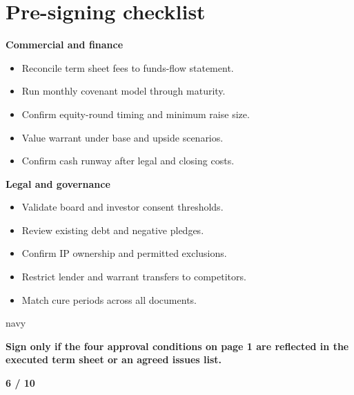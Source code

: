 \section{Pre-signing checklist}

\begin{minipage}[t]{0.49\textwidth}
  \begin{outlinebox}
    \textbf{Commercial and finance}
    \begin{itemize}
      \item[$\square$] Reconcile term sheet fees to funds-flow statement.
      \item[$\square$] Run monthly covenant model through maturity.
      \item[$\square$] Confirm equity-round timing and minimum raise size.
      \item[$\square$] Value warrant under base and upside scenarios.
      \item[$\square$] Confirm cash runway after legal and closing costs.
    \end{itemize}
  \end{outlinebox}
\end{minipage}
\hfill
\begin{minipage}[t]{0.49\textwidth}
  \begin{outlinebox}
    \textbf{Legal and governance}
    \begin{itemize}
      \item[$\square$] Validate board and investor consent thresholds.
      \item[$\square$] Review existing debt and negative pledges.
      \item[$\square$] Confirm IP ownership and permitted exclusions.
      \item[$\square$] Restrict lender and warrant transfers to competitors.
      \item[$\square$] Match cure periods across all documents.
    \end{itemize}
  \end{outlinebox}
\end{minipage}

\begin{callout}{navy}
  \color{white}
  \begin{minipage}[t]{0.73\linewidth}
    \par\vspace{2pt}
    {\large\bfseries Sign only if the four approval conditions on page 1 are reflected in the executed term sheet or an agreed issues list.}
  \end{minipage}
  \hfill
  \begin{minipage}[t]{0.22\linewidth}
    \raggedleft\color{white}
    \par
    {\large\bfseries 6 / 10}
  \end{minipage}
\end{callout}

